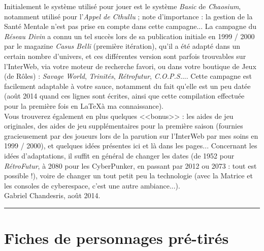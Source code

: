 \documentclass[11pt,twoside,a4paper]{book}
\begin{document}
Initialement le syst{\`e}me utilis{\'e} pour jouer est le syst{\`e}me \emph{Basic} de \emph{Chaosium}, notamment utilis{\'e} pour l'\emph{Appel de Cthullu} ; note d'importance : la gestion de la Sant{\'e} Mentale n'est pas prise en compte dans cette campagne... La campagne du \emph{R{\'e}seau Divin} a connu un tel succ{\`e}s lors de sa publication initiale en 1999 / 2000 par le magazine \emph{Casus Belli} (premi{\`e}re it{\'e}ration), qu'il a {\'e}t{\'e} adapt{\'e} dans un certain nombre d'univers, et ces diff{\'e}rentes version sont parfois trouvables sur l'InterWeb, via votre moteur de recherche favori, ou dans votre boutique de Jeux (de R{\^o}les) : \emph{Savage World}, \emph{Trinit{\'e}s}, \emph{R{\'e}trofutur}, \emph{C.O.P.S.}... Cette campagne est facilement adaptable {\`a} votre sauce, notamment du fait qu'elle est un peu dat{\'e}e (ao{\^u}t 2014 quand ces lignes sont {\'e}crites, ainsi que cette compilation effectu{\'e}e pour la premi{\`e}re fois en \LaTeX  {\`a} ma connaissance). ~\\

Vous trouverez {\'e}galement en plus quelques <<bonus>> : les aides de jeu originales, des aides de jeu suppl{\'e}mentaires pour la premi{\`e}re saison (fournies gracieusement par des joueurs lors de la parution sur l'InterWeb par mes soins en 1999 / 2000), et quelques id{\'e}es pr{\'e}sentes ici et l{\`a} dans les pages... Concernant les id{\'e}es d'adaptations, il suffit en g{\'e}n{\'e}ral de changer les dates (de 1952 pour \emph{R{\'e}troFutur}, {\`a} 2080 pour les CyberPunker, en passant par 2012 ou 2073 : tout est possible !), voire de changer un tout petit peu la technologie (avec la Matrice et les consoles de cyberespace, c'est une autre ambiance...). ~\\

Gabriel Chandesris, ao{\^u}t 2014. ~\\ %

\begin{center} \rule{0.45\textwidth}{0.05cm} \end{center}

\vfill

\section*{Fiches de personnages pr{\'e}-tir{\'e}s}
\end{document}
